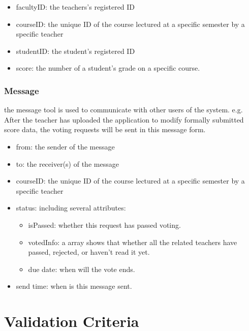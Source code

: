 \documentclass[a4]{article}
\begin{document}
\begin{itemize}
\item facultyID: the teachers's registered ID

\item courseID: the unique ID of the course lectured at a specific semester by a specific teacher

\item studentID: the student's registered ID

\item score: the number of a student's grade on a specific course.
\end{itemize}


\subsubsection{Message}
the message tool is used to communicate with other users of the system. 
e.g. After the teacher has uploaded the application to modify formally submitted score data, the voting requests will be sent in this message form.
\begin{itemize}
\item from: the sender of the message

\item to: the receiver(s) of the message

\item courseID: the unique ID of the course lectured at a specific semester by a specific teacher

\item status: including several attributes:
\begin{itemize}
\item isPassed: whether this request has passed voting.
\item votedInfo: a array shows that whether all the related teachers have passed, rejected, or haven't read it yet.
\item due date: when will the vote ends.
\end{itemize}
\item send time: when is this message sent.

\end{itemize}










\section{Validation Criteria}
\end{document}
